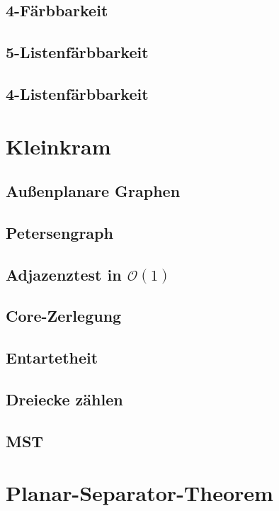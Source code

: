 \documentclass[10pt,a4paper]{article}
\begin{document}
\subsection{4-Färbbarkeit}
\subsection{5-Listenfärbbarkeit}
\subsection{4-Listenfärbbarkeit}



\section{Kleinkram}
\subsection{Außenplanare Graphen}
\subsection{Petersengraph}
\subsection{Adjazenztest in $\mathcal{O}(1)$}
\subsection{Core-Zerlegung}
\subsection{Entartetheit}
\subsection{Dreiecke zählen}
\subsection{MST}


\section{Planar-Separator-Theorem}
\end{document}
